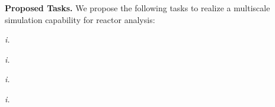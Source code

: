\noindent
{\bf Proposed Tasks.}
We propose the following tasks to realize a multiscale simulation
capability for reactor analysis:
\begin{description}
%
\item{\em i.}
%
\item{\em i.}
%
\item{\em i.}
%
\item{\em i.}
%
\end{description}




















